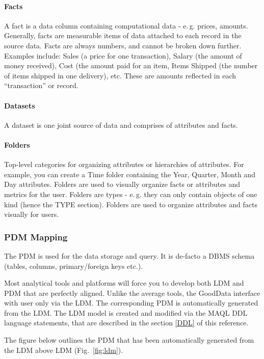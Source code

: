 \documentclass[a4paper, 12pt, titlepage, fleqn]{article}
\begin{document}
\paragraph*{Facts} A fact is a data column containing computational data - e.\,g. prices, amounts. Generally, facts are measurable items of data attached to each record in the source data. Facts are always numbers, and cannot be broken down further. Examples include: Sales (a price for one transaction), Salary (the amount of money received), Cost (the amount paid for an item, Items Shipped (the number of items shipped in one delivery), etc. These are amounts reflected in each “transaction” or record.

\paragraph*{Datasets} A dataset is one joint source of data and comprises of attributes and facts.

\paragraph*{Folders} Top-level categories for organizing attributes or hierarchies of attributes. For example, you can create a Time folder containing the Year, Quarter, Month and Day attributes. 
Folders are used to visually organize facts or attributes and metrics for the user. Folders are types - e.\,g. they can only contain objects of one kind (hence the TYPE section). Folders are used to organize attributes and facts visually for users.

\subsubsection{PDM Mapping}

The PDM is used for the data storage and query. It is de-facto a DBMS schema (tables, columns, primary/foreign keys etc.). 

Most analytical tools and platforms will force you to develop both LDM and PDM that are perfectly aligned. Unlike the average tools, the GoodData interface with user only via the LDM. The corresponding PDM is automatically generated from the LDM. The LDM model is created and modified via the MAQL DDL language statements, that are described in the section \ref{DDL} of this reference.

The figure below outlines the PDM that has been automatically generated from the LDM above LDM (Fig.~\ref{fig:ldm}).
\end{document}
